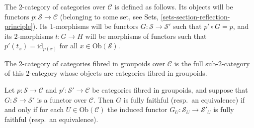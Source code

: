 \begin{definition}
\label{definition-categories-over-C}
The $2$-category of categories over $\mathcal{C}$ is defined
as follows. Its objects will be functors 
$p : \mathcal{S} \to \mathcal{C}$ (belonging to
some set, see Sets, \autoref{sets-section-reflection-principle}). Its 
$1$-morphisms will be functors $G : \mathcal{S} \to \mathcal{S}'$
such that $p' \circ G = p$, and its $2$-morphisms $t : G \to H$
will be morphisms of functors such that $p'(t_x) = \text{id}_{p(x)}$
for all $x \in \text{Ob}(\mathcal{S})$.
\end{definition}

\noindent
The $2$-category of categories fibred in groupoids over $\mathcal{C}$
is the full sub-$2$-category of this $2$-category whose objects
are categories fibred in groupoids.

\begin{lemma}
\label{lemma-equivalence-fibred-categories}
Let $p\colon \mathcal{S}\to \mathcal{C}$ and 
$p'\colon \mathcal{S'}\to \mathcal{C}$ be categories fibred in groupoids, and
suppose that $G\colon \mathcal{S}\to \mathcal {S}'$ is a functor over 
$\mathcal{C}$.  Then $G$ is fully faithful (resp.\ an equivalence) if and only
if for each $U\in\text{Ob}(\mathcal{C})$ the induced functor 
$G_U\colon \mathcal{S}_U\to \mathcal{S}'_U$ is fully faithful (resp.\ an
equivalence).
\end{lemma}


